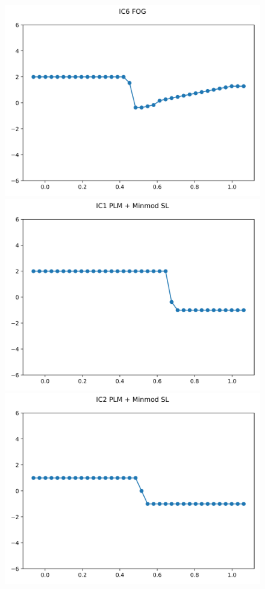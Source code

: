 \documentclass{article}
\begin{document}
\begin{figure}[t]
        \includegraphics[width=.95\textwidth]{../../code/IC6Methodfu_plot.png}
    \emp
        \centering
        \includegraphics[width=.95\textwidth]{../../code/IC1Methodpm_plot.png}
        \includegraphics[width=.95\textwidth]{../../code/IC2Methodpm_plot.png}

\end{figure}
\end{document}
